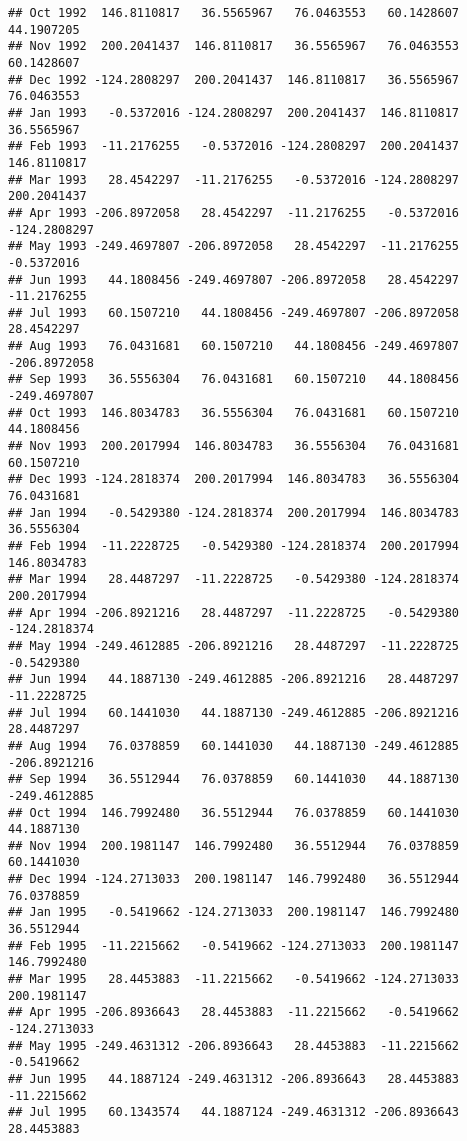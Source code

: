 \documentclass[]{article}
\begin{document}
\begin{verbatim}
## Oct 1992  146.8110817   36.5565967   76.0463553   60.1428607   44.1907205
## Nov 1992  200.2041437  146.8110817   36.5565967   76.0463553   60.1428607
## Dec 1992 -124.2808297  200.2041437  146.8110817   36.5565967   76.0463553
## Jan 1993   -0.5372016 -124.2808297  200.2041437  146.8110817   36.5565967
## Feb 1993  -11.2176255   -0.5372016 -124.2808297  200.2041437  146.8110817
## Mar 1993   28.4542297  -11.2176255   -0.5372016 -124.2808297  200.2041437
## Apr 1993 -206.8972058   28.4542297  -11.2176255   -0.5372016 -124.2808297
## May 1993 -249.4697807 -206.8972058   28.4542297  -11.2176255   -0.5372016
## Jun 1993   44.1808456 -249.4697807 -206.8972058   28.4542297  -11.2176255
## Jul 1993   60.1507210   44.1808456 -249.4697807 -206.8972058   28.4542297
## Aug 1993   76.0431681   60.1507210   44.1808456 -249.4697807 -206.8972058
## Sep 1993   36.5556304   76.0431681   60.1507210   44.1808456 -249.4697807
## Oct 1993  146.8034783   36.5556304   76.0431681   60.1507210   44.1808456
## Nov 1993  200.2017994  146.8034783   36.5556304   76.0431681   60.1507210
## Dec 1993 -124.2818374  200.2017994  146.8034783   36.5556304   76.0431681
## Jan 1994   -0.5429380 -124.2818374  200.2017994  146.8034783   36.5556304
## Feb 1994  -11.2228725   -0.5429380 -124.2818374  200.2017994  146.8034783
## Mar 1994   28.4487297  -11.2228725   -0.5429380 -124.2818374  200.2017994
## Apr 1994 -206.8921216   28.4487297  -11.2228725   -0.5429380 -124.2818374
## May 1994 -249.4612885 -206.8921216   28.4487297  -11.2228725   -0.5429380
## Jun 1994   44.1887130 -249.4612885 -206.8921216   28.4487297  -11.2228725
## Jul 1994   60.1441030   44.1887130 -249.4612885 -206.8921216   28.4487297
## Aug 1994   76.0378859   60.1441030   44.1887130 -249.4612885 -206.8921216
## Sep 1994   36.5512944   76.0378859   60.1441030   44.1887130 -249.4612885
## Oct 1994  146.7992480   36.5512944   76.0378859   60.1441030   44.1887130
## Nov 1994  200.1981147  146.7992480   36.5512944   76.0378859   60.1441030
## Dec 1994 -124.2713033  200.1981147  146.7992480   36.5512944   76.0378859
## Jan 1995   -0.5419662 -124.2713033  200.1981147  146.7992480   36.5512944
## Feb 1995  -11.2215662   -0.5419662 -124.2713033  200.1981147  146.7992480
## Mar 1995   28.4453883  -11.2215662   -0.5419662 -124.2713033  200.1981147
## Apr 1995 -206.8936643   28.4453883  -11.2215662   -0.5419662 -124.2713033
## May 1995 -249.4631312 -206.8936643   28.4453883  -11.2215662   -0.5419662
## Jun 1995   44.1887124 -249.4631312 -206.8936643   28.4453883  -11.2215662
## Jul 1995   60.1343574   44.1887124 -249.4631312 -206.8936643   28.4453883

\end{verbatim}
\end{document}
